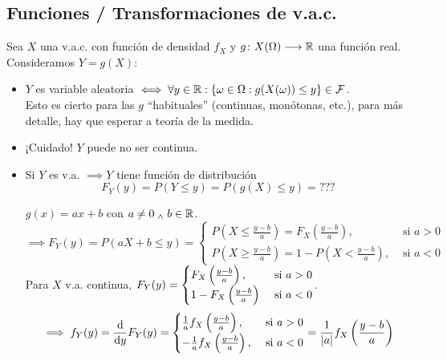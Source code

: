 \subsection{Funciones / Transformaciones de v.a.c.}
Sea $X$ una v.a.c. con función de densidad $f_X$ y $g \colon X(\Omega) \longrightarrow \mathbb{R}$ una función real. Consideramos $Y=g(X)$:
\begin{itemize}
	\item $Y$ es variable aleatoria $\iff \forall y \in \mathbb{R} : \{\omega \in \Omega : g(X(\omega)) \leq y\} \in \mathcal{F}$.\\
	      Esto es cierto para las $g$ ``habituales'' (continuas, monótonas, etc.), para más detalle, hay que esperar a teoría de la medida.
	\item ¡Cuidado! $Y$ puede no ser continua.
	\item Si $Y$ es v.a. $\implies Y$ tiene función de distribución
	      \[F_Y(y) = P(Y\leq y) = P(g(X)\leq y) = ???\]
	      \begin{ejem}
		      $g(x) = ax + b$ con $a\ne 0 \; _{\wedge} \; b \in \mathbb{R}$.
		      \[\implies F_Y(y)= P(aX+b\leq y) = \begin{cases}
				      P\left(X \leq \frac{y-b}{a}\right) = F_X\left(\frac{y-b}{a}\right),       & \text{ si } a>0 \\
				      P\left(X \geq \frac{y-b}{a}\right) = 1 - P\left(X < \frac{y-b}{a}\right), & \text{ si } a<0
			      \end{cases}\]
		      Para $X$ v.a. continua, $\displaystyle F_Y(y) = \begin{cases}
				      F_X\left(\frac{y-b}{a}\right),  & \text{ si } a>0 \\
				      1-F_X\left(\frac{y-b}{a}\right) & \text{ si } a<0
			      \end{cases}$.
		      \[\implies f_Y(y) =\odv{}{y} F_Y(y) = \begin{cases}
				      \frac{1}{a} f_X\left(\frac{y-b}{a}\right),  & \text{ si } a>0 \\
				      -\frac{1}{a} f_X\left(\frac{y-b}{a}\right), & \text{ si } a<0
			      \end{cases} = \frac{1}{\abs{a}} f_X\left(\frac{y-b}{a}\right)\]
	      \end{ejem}
\end{itemize}

